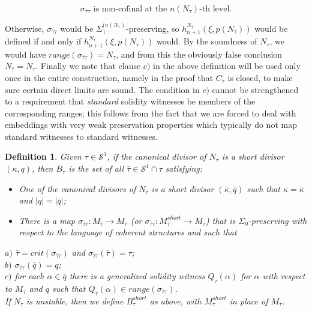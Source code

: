 \documentclass[12pt]{article}
\newtheorem{defn}[thm]{Definition}
\begin{document}
\[
\sigma_{\bar{\tau} \tau } \text{ is non-cofinal at the $n(N_\tau)$-th level.}
\]

Otherwise, $\sigma_{\bar{\tau} \tau }$ would be $\Sigma_1^{(n(N_\tau)}$-preserving, so $h_{n+1}^{N_{\bar{\tau}}} (\xi , p (N_{\bar{\tau}}))$ would be defined if and only if $h_{n+1}^{N_{\tau}} (\xi , p (N_\tau))$ would.  By the soundness of $N_\tau$, we would have $range ( \sigma_{\bar{\tau} \tau }) = N_\tau$, and from this the obviously false conclusion $N_{\bar{\tau}} = N_\tau$.  Finally we note that clause $c)$ in the above definition will be used only once in the entire construction, namely in the proof that $C_{\tau}$ is closed, to make sure certain direct limits are sound.  The condition in $c)$ cannot be strengthened to a requirement that \textit{standard} solidity witnesses be members of the corresponding ranges; this follows from the fact that we are forced to deal with embeddings with very weak preservation properties which typically do not map standard witnesses to standard witnesses.\\

\begin{defn} \label{short B-tau sequence on S^1}
Given $\tau \in \mathcal{S}^1$, if the canonical divisor of $N_\tau$ is a short divisor $(\kappa , q)$, then $B_\tau$ is the set of all $\bar{\tau} \in \mathcal{S}^1 \cap \tau$ satisfying:

\begin{itemize}
\item{One of the canonical divisors of $N_{\bar{\tau}}$ is a short divisor $(\bar{\kappa} , \bar{q})$ such that $\kappa = \bar{\kappa}$ and $|q| = |\bar{q}|$;}
\item{There is a map $\sigma_{\bar{\tau} \tau } : M_{\bar{\tau}} \longrightarrow M_\tau$ (or $\sigma_{\bar{\tau} \tau } : M_{\bar{\tau}}^{short} \longrightarrow M_\tau$) that is $\Sigma_0$-preserving with respect to the language of coherent structures and such that}
\end{itemize}

\indent \indent $a)$ $\bar{\tau} = crit (\sigma_{\bar{\tau} \tau })$ and $\sigma_{\bar{\tau} \tau } (\bar{\tau}) = \tau $;\\

\indent \indent $b)$ $\sigma_{\bar{\tau} \tau } (\bar{q}) = q$;\\

\indent \indent $c)$ for each $\alpha \in \bar{q}$ there is a generalized solidity witness $Q_\tau (\alpha )$ for $\alpha$ with respect to $M_\tau$ and $q$ such that $Q_\tau (\alpha ) \in range ( \sigma_{\bar{\tau} \tau } )$.\\

If $N_\tau$ is unstable, then we define $B_\tau^{short}$ as above, with $M_\tau^{short}$ in place of $M_\tau$.


\end{defn}
\end{document}
